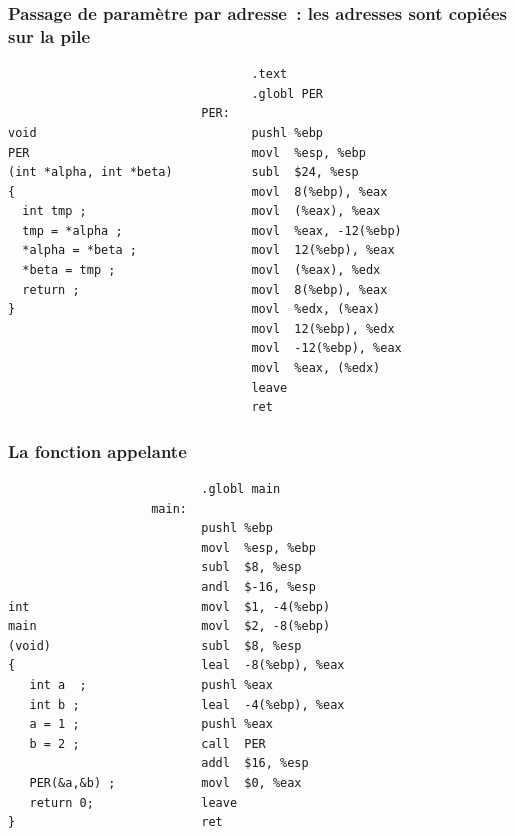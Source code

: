 \begin{frame}[fragile]
  \frametitle{Passage de param\`etre par adresse~: les adresses sont copi\'ees sur la pile}%
\begin{verbatim}
                                  .text         
                                  .globl PER                   
                           PER:                     
void                              pushl %ebp             
PER                               movl  %esp, %ebp     
(int *alpha, int *beta)           subl  $24, %esp      
{                                 movl  8(%ebp), %eax  
  int tmp ;                       movl  (%eax), %eax     
  tmp = *alpha ;                  movl  %eax, -12(%ebp)   
  *alpha = *beta ;                movl  12(%ebp), %eax 
  *beta = tmp ;                   movl  (%eax), %edx
  return ;                        movl  8(%ebp), %eax 
}                                 movl  %edx, (%eax)  
                                  movl  12(%ebp), %edx   
                                  movl  -12(%ebp), %eax   
                                  movl  %eax, (%edx)  
                                  leave                           
                                  ret                 
\end{verbatim}
\end{frame}
\begin{frame}[fragile]
  \frametitle{La fonction appelante}%
\begin{verbatim}
                           .globl main                
                    main:                        
                           pushl %ebp                
                           movl  %esp, %ebp        
                           subl  $8, %esp        
                           andl  $-16, %esp        
int                        movl  $1, -4(%ebp)        
main                       movl  $2, -8(%ebp)        
(void)                     subl  $8, %esp        
{                          leal  -8(%ebp), %eax  
   int a  ;                pushl %eax                
   int b ;                 leal  -4(%ebp), %eax  
   a = 1 ;                 pushl %eax                
   b = 2 ;                 call  PER                
                           addl  $16, %esp        
   PER(&a,&b) ;            movl  $0, %eax        
   return 0;               leave                              
}                          ret              
\end{verbatim}
\end{frame}

